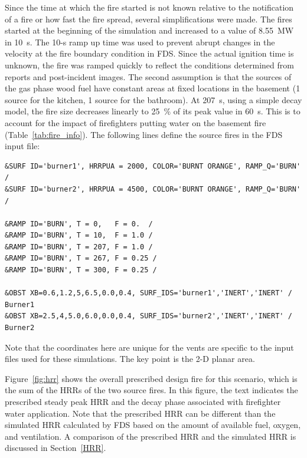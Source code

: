 \documentclass[12pt,oneside]{book}
\begin{document}
Since the time at which the fire started is not known relative to the notification of a fire or how fast the fire spread, several simplifications were made. The fires started at the beginning of the simulation and increased to a value of 8.55~MW in 10~s. The 10-s ramp up time was used to prevent abrupt changes in the velocity at the fire boundary condition in FDS. Since the actual ignition time is unknown, the fire was ramped quickly to reflect the conditions determined from reports and post-incident images. The second assumption is that the sources of the gas phase wood fuel have constant areas at fixed locations in the basement (1 source for the kitchen, 1 source for the bathroom).  At 207~s, using a simple decay model, the fire size decreases linearly to 25~\% of its peak value in 60~s. This is to account for the impact of firefighters putting water on the basement fire (Table~\ref{tab:fire_info}). The following lines define the source fires in the FDS input file:

\begin{lstlisting}
&SURF ID='burner1', HRRPUA = 2000, COLOR='BURNT ORANGE', RAMP_Q='BURN' /
&SURF ID='burner2', HRRPUA = 4500, COLOR='BURNT ORANGE', RAMP_Q='BURN' /

&RAMP ID='BURN', T = 0,   F = 0.  /
&RAMP ID='BURN', T = 10,  F = 1.0 /
&RAMP ID='BURN', T = 207, F = 1.0 /
&RAMP ID='BURN', T = 267, F = 0.25 /
&RAMP ID='BURN', T = 300, F = 0.25 /

&OBST XB=0.6,1.2,5,6.5,0.0,0.4, SURF_IDS='burner1','INERT','INERT' /  Burner1
&OBST XB=2.5,4,5.0,6.0,0.0,0.4, SURF_IDS='burner2','INERT','INERT' /  Burner2
\end{lstlisting}
Note that the coordinates here are unique for the vents are specific to the input files used for these simulations. The key point is the 2-D planar area. 

Figure~\ref{fig:hrr} shows the overall prescribed design fire for this scenario, which is the sum of the HRRs of the two source fires. In this figure, the text indicates the prescribed steady peak HRR and the decay phase associated with firefighter water application. Note that the prescribed HRR can be different than the simulated HRR calculated by FDS based on the amount of available fuel, oxygen, and ventilation. A comparison of the prescribed HRR and the simulated HRR is discussed in Section~\ref{HRR}.
\end{document}
